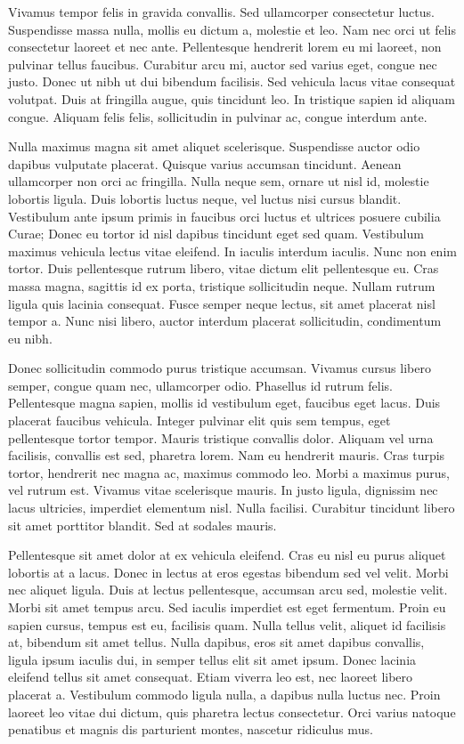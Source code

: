 Vivamus tempor felis in gravida convallis. Sed ullamcorper consectetur luctus. Suspendisse massa nulla, mollis eu dictum a, molestie et leo. Nam nec orci ut felis consectetur laoreet et nec ante. Pellentesque hendrerit lorem eu mi laoreet, non pulvinar tellus faucibus. Curabitur arcu mi, auctor sed varius eget, congue nec justo. Donec ut nibh ut dui bibendum facilisis. Sed vehicula lacus vitae consequat volutpat. Duis at fringilla augue, quis tincidunt leo. In tristique sapien id aliquam congue. Aliquam felis felis, sollicitudin in pulvinar ac, congue interdum ante.

Nulla maximus magna sit amet aliquet scelerisque. Suspendisse auctor odio dapibus vulputate placerat. Quisque varius accumsan tincidunt. Aenean ullamcorper non orci ac fringilla. Nulla neque sem, ornare ut nisl id, molestie lobortis ligula. Duis lobortis luctus neque, vel luctus nisi cursus blandit. Vestibulum ante ipsum primis in faucibus orci luctus et ultrices posuere cubilia Curae; Donec eu tortor id nisl dapibus tincidunt eget sed quam. Vestibulum maximus vehicula lectus vitae eleifend. In iaculis interdum iaculis. Nunc non enim tortor. Duis pellentesque rutrum libero, vitae dictum elit pellentesque eu. Cras massa magna, sagittis id ex porta, tristique sollicitudin neque. Nullam rutrum ligula quis lacinia consequat. Fusce semper neque lectus, sit amet placerat nisl tempor a. Nunc nisi libero, auctor interdum placerat sollicitudin, condimentum eu nibh.

Donec sollicitudin commodo purus tristique accumsan. Vivamus cursus libero semper, congue quam nec, ullamcorper odio. Phasellus id rutrum felis. Pellentesque magna sapien, mollis id vestibulum eget, faucibus eget lacus. Duis placerat faucibus vehicula. Integer pulvinar elit quis sem tempus, eget pellentesque tortor tempor. Mauris tristique convallis dolor. Aliquam vel urna facilisis, convallis est sed, pharetra lorem. Nam eu hendrerit mauris. Cras turpis tortor, hendrerit nec magna ac, maximus commodo leo. Morbi a maximus purus, vel rutrum est. Vivamus vitae scelerisque mauris. In justo ligula, dignissim nec lacus ultricies, imperdiet elementum nisl. Nulla facilisi. Curabitur tincidunt libero sit amet porttitor blandit. Sed at sodales mauris.

Pellentesque sit amet dolor at ex vehicula eleifend. Cras eu nisl eu purus aliquet lobortis at a lacus. Donec in lectus at eros egestas bibendum sed vel velit. Morbi nec aliquet ligula. Duis at lectus pellentesque, accumsan arcu sed, molestie velit. Morbi sit amet tempus arcu. Sed iaculis imperdiet est eget fermentum. Proin eu sapien cursus, tempus est eu, facilisis quam. Nulla tellus velit, aliquet id facilisis at, bibendum sit amet tellus. Nulla dapibus, eros sit amet dapibus convallis, ligula ipsum iaculis dui, in semper tellus elit sit amet ipsum. Donec lacinia eleifend tellus sit amet consequat. Etiam viverra leo est, nec laoreet libero placerat a. Vestibulum commodo ligula nulla, a dapibus nulla luctus nec. Proin laoreet leo vitae dui dictum, quis pharetra lectus consectetur. Orci varius natoque penatibus et magnis dis parturient montes, nascetur ridiculus mus.

